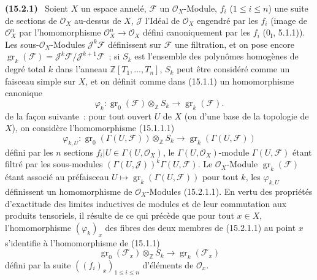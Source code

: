 \documentclass[10pt,oneside]{book}
\makeatletter
\newcommand{\gr}{\operatorname{gr}}
\newcommand{\setmanualcurrentlabel}[1]{\def\@currentlabel{#1}}
\newcommand{\oldpage}[2][]{%
  \setcounter{footnote}{0}%
  \marginpar{\scriptsize\textbf{#1}~|~#2}\ignorespaces}
\newenvironment{env}[1][]{\setmanualcurrentlabel{#1}\par\medskip\noindent\textbf{(#1)}\ }{\par}
\makeatother
\begin{document}
\begin{env}[15.2.1]
\label{0.15.2.1-fr}
Soient $X$ un espace annelé, $\mathscr{F}$ un $\mathcal{O}_X$-Module,
$f_i$ ($1\leq i\leq n$) une suite de sections de $\mathcal{O}_X$ au-dessus
de $X$, $\mathscr{J}$ l'Idéal de $\mathcal{O}_X$ engendré par les $f_i$
(image de $\mathcal{O}_X^n$ par l'homomorphisme
$\mathcal{O}_X^n\to\mathcal{O}_X$ défini canoniquement par les $f_i$
($0_{\mathrm I}$, 5.1.1)). Les sous-$\mathcal{O}_X$-Modules
$\mathscr{J}^k\mathscr{F}$ définissent sur $\mathscr{F}$ une filtration, et
on pose encore
$\gr_k(\mathscr{F})=\mathscr{J}^k\mathscr{F}/\mathscr{J}^{k+1}\mathscr{F}$~;
si $S_k$ est l'ensemble des polynômes homogènes de degré total $k$ dans
l'anneau $\mathbb{Z}[T_1,\ldots,T_n]$, $S_k$ peut être considéré comme un
faisceau simple sur $X$, et on définit comme dans (15.1.1) un homomorphisme
canonique
\[
\label{0.15.2.1.1-fr}
  \varphi_k:\gr_0(\mathscr{F})\otimes_{\mathbb Z}S_k
  \longrightarrow\gr_k(\mathscr{F}).
\tag{15.2.1.1}
\]
\oldpage[0\textsubscript{IV-1}]{21}
de la façon suivante~: pour tout ouvert $U$ de $X$ (ou d'une base de la
topologie de $X$), on considère l'homomorphisme (15.1.1.1)
\[
  \varphi_{k,U}:\gr_0(\Gamma(U,\mathscr{F}))\otimes_{\mathbb Z}S_k
  \longrightarrow\gr_k(\Gamma(U,\mathscr{F}))
\]
défini par les $n$ sections $f_i|U\in\Gamma(U,\mathcal{O}_X)$, le
$\Gamma(U,\mathcal{O}_X)$-module $\Gamma(U,\mathscr{F})$ étant filtré par les
sous-modules $(\Gamma(U,\mathscr{J}))^k\Gamma(U,\mathscr{F})$. Le
$\mathcal{O}_X$-Module $\gr_k(\mathscr{F})$ étant associé au préfaisceau
$U\mapsto\gr_k(\Gamma(U,\mathscr{F}))$ pour tout $k$, les $\varphi_{k,U}$
définissent un homomorphisme de $\mathcal{O}_X$-Modules (15.2.1.1). En vertu
des propriétés d'exactitude des limites inductives de modules et de leur
commutation aux produits tensoriels, il résulte de ce qui précède que pour
tout $x\in X$, l'homomorphisme $(\varphi_k)_x$ des fibres des deux membres de
(15.2.1.1) au point $x$ s'identifie à l'homomorphisme de (15.1.1)
\[
\label{0.15.2.1.2-fr}
  \gr_0(\mathscr{F}_x)\otimes_{\mathbb Z}S_k
  \longrightarrow\gr_k(\mathscr{F}_x)
\tag{15.2.1.2}
\]
défini par la suite $((f_i)_x)_{1\leq i\leq n}$ d'éléments de
$\mathcal{O}_x$.
\end{env}
\end{document}
